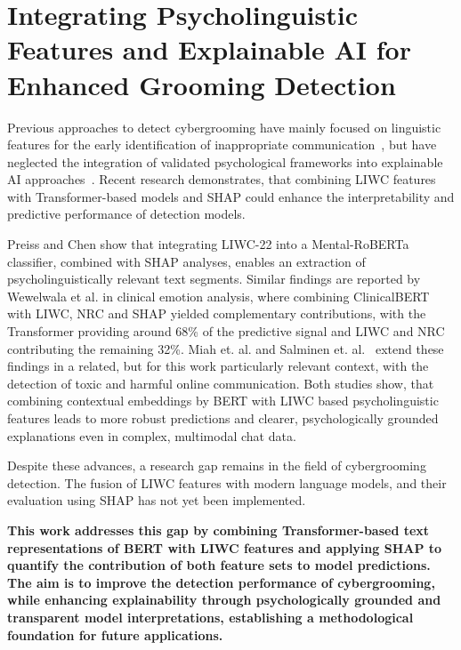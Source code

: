
\section{Integrating Psycholinguistic Features and Explainable AI for Enhanced Grooming Detection}
Previous approaches to detect cybergrooming have mainly focused on linguistic features for the early identification of inappropriate communication~\cite{yakut-kilic-pan-2022-incorporating}, but have neglected the integration of validated psychological frameworks into explainable AI approaches~\cite{broome2020psycholinguistic}. Recent research demonstrates, that combining LIWC features with Transformer-based models and SHAP could enhance the interpretability and predictive performance of detection models.

Preiss and Chen \cite{preiss-chen-2024-incorporating} show that integrating LIWC-22 into a Mental-RoBERTa classifier, combined with SHAP analyses, enables an extraction of psycholinguistically relevant text segments. Similar findings are reported by Wewelwala et al. \cite{wewelwala2025hybrid} in clinical emotion analysis, where combining ClinicalBERT with LIWC, NRC and SHAP yielded complementary contributions, with the Transformer providing around 68\% of the predictive signal and LIWC and NRC contributing the remaining 32\%. 
Miah et. al.\cite{miah-etal-2011-detection} and Salminen et. al.~\cite{salminen2025} extend these findings in a related, but for this work particularly relevant context, with the detection of toxic and harmful online communication. Both studies show, that combining contextual embeddings by BERT with LIWC based psycholinguistic features leads to more robust predictions and clearer, psychologically grounded explanations even in complex, multimodal chat data.

Despite these advances, a research gap remains in the field of cybergrooming detection. The fusion of LIWC features with modern language models, and their evaluation using SHAP has not yet been implemented.

\textbf{This work addresses this gap by combining Transformer-based text representations of BERT with LIWC features and applying SHAP to quantify the contribution of both feature sets to model predictions. The aim is to improve the detection performance of cybergrooming, while enhancing explainability through psychologically grounded and transparent model interpretations, establishing a methodological foundation for future applications.}







